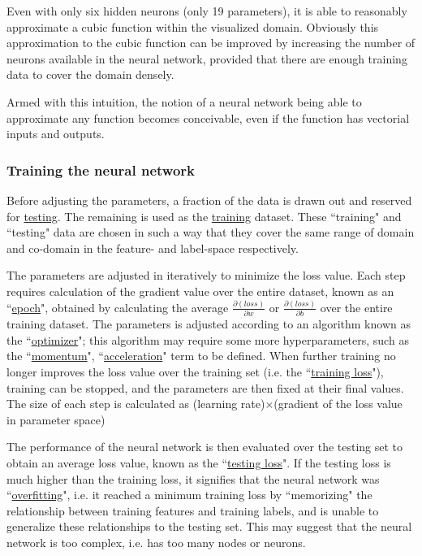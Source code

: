 \documentclass[a4paper, 12pt]{article}
\begin{document}
    Even with only six hidden neurons (only 19 parameters), it is able to reasonably approximate a cubic function within the visualized domain. Obviously this approximation to the cubic function can be improved by increasing the number of neurons available in the neural network, provided that there are enough training data to cover the domain densely.

    Armed with this intuition, the notion of a neural network being able to approximate any function becomes conceivable, even if the function has vectorial inputs and outputs. %

\subsubsection{Training the neural network}\label{sec:training}
    Before adjusting the parameters, a fraction of the data is drawn out and reserved for \underline{testing}. The remaining is used as the \underline{training} dataset. These ``training" and ``testing" data are chosen in such a way that they cover the same range of domain and co-domain in the feature- and label-space respectively.
    
    The parameters are adjusted in iteratively to minimize the loss value. Each step requires calculation of the gradient value over the entire dataset, known as an ``\underline{epoch}", obtained by calculating the average $\frac{\partial (loss)}{\partial w}$ or $\frac{\partial (loss)}{\partial b}$ over the entire training dataset. The parameters is adjusted according to an algorithm known as the ``\underline{optimizer}"; this algorithm may require some more hyperparameters, such as the ``\underline{momentum}", ``\underline{acceleration}" term to be defined. When further training no longer improves the loss value over the training set (i.e. the ``\underline{training loss}"), training can be stopped, and the parameters are then fixed at their final values. The size of each step is calculated as (learning rate)$\times$(gradient of the loss value in parameter space)

    The performance of the neural network is then evaluated over the testing set to obtain an average loss value, known as the ``\underline{testing loss}". If the testing loss is much higher than the training loss, it signifies that the neural network was ``\underline{overfitting}", i.e. it reached a minimum training loss by ``memorizing" the relationship between training features and training labels, and is unable to generalize these relationships to the testing set. This may suggest that the neural network is too complex, i.e. has too many nodes or neurons.
\end{document}
